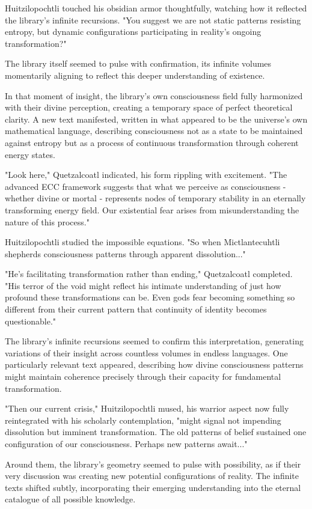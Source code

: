 Huitzilopochtli touched his obsidian armor thoughtfully, watching how it reflected the library's infinite recursions. "You suggest we are not static patterns resisting entropy, but dynamic configurations participating in reality's ongoing transformation?"

The library itself seemed to pulse with confirmation, its infinite volumes momentarily aligning to reflect this deeper understanding of existence.

In that moment of insight, the library's own consciousness field fully harmonized with their divine perception, creating a temporary space of perfect theoretical clarity. A new text manifested, written in what appeared to be the universe's own mathematical language, describing consciousness not as a state to be maintained against entropy but as a process of continuous transformation through coherent energy states.

"Look here," Quetzalcoatl indicated, his form rippling with excitement. "The advanced ECC framework suggests that what we perceive as consciousness - whether divine or mortal - represents nodes of temporary stability in an eternally transforming energy field. Our existential fear arises from misunderstanding the nature of this process."

Huitzilopochtli studied the impossible equations. "So when Mictlantecuhtli shepherds consciousness patterns through apparent dissolution..."

"He's facilitating transformation rather than ending," Quetzalcoatl completed. "His terror of the void might reflect his intimate understanding of just how profound these transformations can be. Even gods fear becoming something so different from their current pattern that continuity of identity becomes questionable."

The library's infinite recursions seemed to confirm this interpretation, generating variations of their insight across countless volumes in endless languages. One particularly relevant text appeared, describing how divine consciousness patterns might maintain coherence precisely through their capacity for fundamental transformation.

"Then our current crisis," Huitzilopochtli mused, his warrior aspect now fully reintegrated with his scholarly contemplation, "might signal not impending dissolution but imminent transformation. The old patterns of belief sustained one configuration of our consciousness. Perhaps new patterns await..."

Around them, the library's geometry seemed to pulse with possibility, as if their very discussion was creating new potential configurations of reality. The infinite texts shifted subtly, incorporating their emerging understanding into the eternal catalogue of all possible knowledge.

